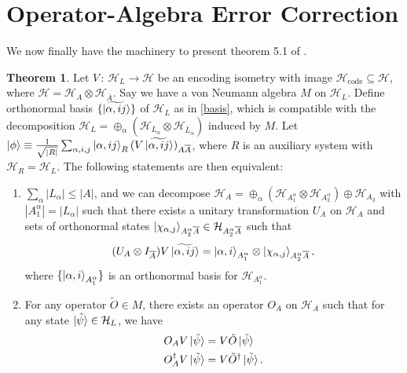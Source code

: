 \documentclass[12pt,a4paper]{report}
\numberwithin{equation}{section}
\newcommand{\Hcode}{\mathcal{H}_{\text{code}}}
\newcommand{\ol}[1]{\overline{#1}}
\theoremstyle{definition}
\theoremstyle{theorem}
\newtheorem{theorem}{Theorem}[section]
\theoremstyle{theorem}
\theoremstyle{example}
\theoremstyle{definition}
\begin{document}
\section{Operator-Algebra Error Correction}
We now finally have the machinery to present theorem 5.1 of \cite{Harlow}.
\begin{theorem}\label{5.1}
	Let $V\,:\,\mathcal{H}_{L}\to \mathcal{H}$ be an encoding isometry with image $\Hcode\subseteq\mathcal{H}$, where $\mathcal{H}=\mathcal{H}_{A}\otimes\mathcal{H}_{\ol{A}}$. Say we have a von Neumann algebra $M$ on $\mathcal{H}_{L}$. Define orthonormal basis $\{\ket{\widetilde{\alpha,ij}}\}$ of $\mathcal{H}_{L}$ as in \ref{basis}, which is compatible with the decomposition $\mathcal{H}_{L}=\oplus_{\alpha}(\mathcal{H}_{L_{\alpha}}\otimes\mathcal{H}_{\ol{L}_{\alpha}})$ induced by $M$. Let $\ket{\phi}\equiv\frac{1}{\sqrt{|R|}}\sum_{\alpha,i,j}\ket{\alpha,ij}_{R}(V\ket{\widetilde{\alpha,ij}})_{A\ol{A}}$, where $R$ is an auxiliary system with $\mathcal{H}_{R}=\mathcal{H}_{L}$. The following statements are then equivalent:
	\begin{enumerate}
		\item $\sum_{\alpha}|L_{\alpha}|\leq|A|$, and we can decompose $\mathcal{H}_{A}=\oplus_{\alpha}(\mathcal{H}_{A_{1}^{\alpha}}\otimes\mathcal{H}_{A_{2}^{\alpha}})\oplus\mathcal{H}_{A_{3}}$ with $|A_{1}^{\alpha}|=|L_{\alpha}|$ such that there exists a unitary transformation $U_{A}$ on $\mathcal{H}_{A}$ and sets of orthonormal states $\ket{\chi_{\alpha,j}}_{A_{2}^{\alpha}\ol{A}}\in\mathcal{H}_{A_{2}^{\alpha}\ol{A}}$ such that
		\begin{equation}\label{O1}
			(U_{A}\otimes I_{\ol{A}})V\ket{\widetilde{\alpha,ij}}=\ket{\alpha,i}_{A_{1}^{\alpha}}\otimes\ket{\chi_{\alpha,j}}_{A_{2}^{\alpha}\ol{A}},
		\end{equation}
		where $\{\ket{\alpha,i}_{A_{1}^{\alpha}}\}$ is an orthonormal basis for $\mathcal{H}_{A_{1}^{\alpha}}$.
		\item For any operator $\tilde{O}\in M$, there exists an operator $O_{A}$ on $\mathcal{H}_{A}$ such that for any state $\ket{\tilde{\psi}}\in\mathcal{H}_{L}$, we have
		\begin{equation}\label{O2}
			\begin{aligned}
				O_{A}V\ket{\tilde{\psi}}&=V\tilde{O}\ket{\tilde{\psi}}\\
				O_{A}^{\dagger}V\ket{\tilde{\psi}}&=V\tilde{O}^{\dagger}\ket{\tilde{\psi}}.
			\end{aligned}
		\end{equation}

\end{enumerate}
\end{theorem}
\end{document}
